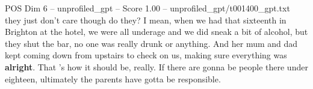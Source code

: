 \begin{textsample}{POS Dim 6 – unprofiled\_gpt – Score 1.00 – unprofiled\_gpt/t001400\_gpt.txt}  \label{ex:f6_pos_024}
they just don't care though do they?
I mean, when we had that sixteenth in Brighton at the hotel, we were all underage and we did sneak a bit of alcohol, but they shut the bar, no one was really drunk or anything.
And her mum and dad kept coming down from upstairs to check on us, making sure everything was \textbf{alright}.
That ’s how it should be, really.
If there are gonna be people there under eighteen, ultimately the parents have gotta be responsible.

\end{textsample}
